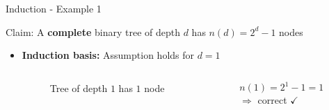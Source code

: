\begin{frame}{Induction - Example 1}
  \begin{block}{Claim:}
    A \textbf{complete} binary tree of depth $d$ has $n(d) = 2^d - 1$ nodes
  \end{block}
  \begin{itemize}
    \item
      \textbf{Induction basis:} Assumption holds for {\color{MainA}$d = 1$}
      \begin{columns}
        \begin{column}{0.5\linewidth}
          \begin{figure}[!h]
            \begin{adjustbox}{width=4em}
              
            \end{adjustbox}
            \caption{Tree of depth {\color{MainA}$1$} has
              {\color{MainA}$1$} node}
          \end{figure}
        \end{column}
        \begin{column}{0.5\linewidth}
          {\color{MainA}$n(1) = 2^1 - 1 = 1$}\\
          $\Rightarrow$ correct $\checkmark$
        \end{column}
      \end{columns}
  \end{itemize}
\end{frame}


